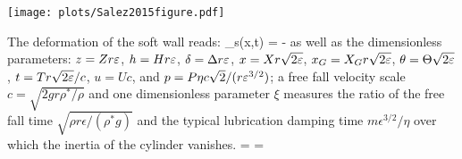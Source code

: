 \documentclass[books,12pt]{elegantpaper}
\begin{document}

\begin{center}
\texttt{[image: plots/Salez2015figure.pdf]}
\end{center}

The deformation of the soft wall reads:
\beq \delta_s(x,t) = -   \eeq
as well as the dimensionless parameters:
$z=Zr\varepsilon$, $h=Hr\varepsilon$, $\delta = \Delta r\varepsilon$, $x = Xr\sqrt{2\varepsilon}$, $x_G=X_G r \sqrt{2\varepsilon}$, $\theta = \Theta\sqrt{2\varepsilon}$, $t=Tr\sqrt{2\varepsilon}/c$, $u=Uc$, and $p=P\eta c\sqrt{2}/(r\varepsilon^{3/2})$; a free fall velocity scale $c=\sqrt{2gr\rho^\ast / \rho}$ and one dimensionless parameter $\xi$ measures the ratio of the free fall time $\sqrt{\rho r \epsilon / (\rho^\ast g)}$ and the typical lubrication damping time $m\epsilon^{3/2}/\eta$ over which the inertia of the cylinder vanishes.
\beq \xi =  
\beq \kappa =  
\end{document}

